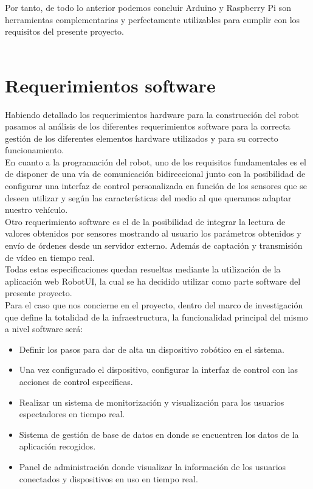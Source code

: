 Por tanto, de todo lo anterior podemos concluir Arduino y Raspberry Pi son herramientas complementarias y perfectamente utilizables para cumplir con los requisitos del presente proyecto.\\\\


\section{Requerimientos software}
\label{sec:requerimientos-software}

Habiendo detallado los requerimientos hardware para la construcción del robot pasamos al análisis de los diferentes requerimientos software para la correcta
gestión de los diferentes elementos hardware utilizados y para su correcto funcionamiento.\\

En cuanto a la programación del robot, uno de los requisitos fundamentales es el de disponer de una vía de comunicación bidireccional junto con la posibilidad de
configurar una interfaz de control personalizada en función de los sensores que se deseen utilizar y según las características del medio al que queramos adaptar nuestro vehículo.\\

Otro requerimiento software es el de la posibilidad de integrar la lectura de valores obtenidos por sensores mostrando al usuario los parámetros obtenidos y envío de órdenes
desde un servidor externo. Además de captación y transmisión de vídeo en tiempo real.\\

Todas estas especificaciones quedan resueltas mediante la utilización de la aplicación web RobotUI, la cual se ha decidido utilizar como parte software del presente proyecto.\\















Para el caso que nos concierne en el proyecto, dentro del marco de investigación que define la totalidad de la infraestructura, la funcionalidad principal del mismo a nivel 
software será:\\

\begin{itemize}
\item Definir los pasos para dar de alta un dispositivo robótico en el sistema.
\item Una vez configurado el dispositivo, configurar la interfaz de control con las acciones de control específicas.
\item Realizar un sistema de monitorización y visualización para los usuarios espectadores en tiempo real.
\item Sistema de gestión de base de datos en donde se encuentren los datos de la aplicación recogidos.
\item Panel de administración donde visualizar la información de los usuarios conectados y dispositivos en uso en tiempo real.
\end{itemize}

